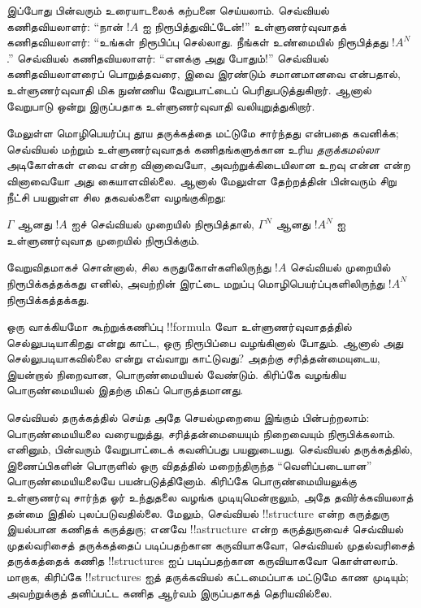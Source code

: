 \documentclass[../../../include/open-logic-section]{subfiles}
\begin{document}
இப்போது பின்வரும் உரையாடலைக் கற்பனை செய்யலாம். செவ்வியல்
கணிதவியலாளர்: ``நான் $!A$ ஐ நிரூபித்துவிட்டேன்!'' உள்ளுணர்வுவாதக்
கணிதவியலாளர்: ``உங்கள் நிரூபிப்பு செல்லாது. நீங்கள் உண்மையில்
நிரூபித்தது $!A^N$.'' செவ்வியல் கணிதவியலாளர்: ``எனக்கு அது போதும்!''
செவ்வியல் கணிதவியலாளரைப் பொறுத்தவரை, இவை இரண்டும் சமானமானவை என்பதால்,
உள்ளுணர்வுவாதி மிக நுண்ணிய வேறுபாட்டைப் பெரிதுபடுத்துகிறார். ஆனால்
வேறுபாடு ஒன்று இருப்பதாக உள்ளுணர்வுவாதி வலியுறுத்துகிறார்.

மேலுள்ள மொழிபெயர்ப்பு தூய தருக்கத்தை மட்டுமே சார்ந்தது என்பதை
கவனிக்க; செவ்வியல் மற்றும் உள்ளுணர்வுவாதக் கணிதங்களுக்கான உரிய
\emph{தருக்கமல்லா} அடிகோள்கள் எவை என்ற வினாவையோ, அவற்றுக்கிடையிலான
உறவு என்ன என்ற வினாவையோ அது கையாளவில்லை. ஆனால் மேலுள்ள தேற்றத்தின்
பின்வரும் சிறு நீட்சி பயனுள்ள சில தகவல்களை வழங்குகிறது:

\begin{thm}
$\Gamma$ ஆனது $!A$ ஐச் செவ்வியல் முறையில் நிரூபித்தால், $\Gamma^N$
ஆனது $!A^N$ ஐ உள்ளுணர்வுவாத முறையில் நிரூபிக்கும்.
\end{thm}

வேறுவிதமாகச் சொன்னால், சில கருதுகோள்களிலிருந்து $!A$ செவ்வியல்
முறையில் நிரூபிக்கத்தக்கது எனில், அவற்றின் இரட்டை மறுப்பு
மொழிபெயர்ப்புகளிலிருந்து $!A^N$ நிரூபிக்கத்தக்கது.

ஒரு வாக்கியமோ கூற்றுக்கணிப்பு !!{formula} வோ உள்ளுணர்வுவாதத்தில்
செல்லுபடியாகிறது என்று காட்ட, ஒரு நிரூபிப்பை வழங்கினால் போதும்.
ஆனால் அது செல்லுபடியாகவில்லை என்று எவ்வாறு காட்டுவது? அதற்கு
சரித்தன்மையுடைய, இயன்றால் நிறைவான, பொருண்மையியல் வேண்டும்.
கிரிப்கே வழங்கிய பொருண்மையியல் இதற்கு மிகப் பொருத்தமானது.

செவ்வியல் தருக்கத்தில் செய்த அதே செயல்முறையை இங்கும் பின்பற்றலாம்:
பொருண்மையியலை வரையறுத்து, சரித்தன்மையையும் நிறைவையும் நிரூபிக்கலாம்.
எனினும், பின்வரும் வேறுபாட்டைக் கவனிப்பது பயனுடையது. செவ்வியல்
தருக்கத்தில், இணைப்பிகளின் பொருளில் ஒரு விதத்தில் மறைந்திருந்த
``வெளிப்படையான'' பொருண்மையியலையே பயன்படுத்தினோம். கிரிப்கே
பொருண்மையியலுக்கு உள்ளுணர்வு சார்ந்த ஓர் உந்துதலை வழங்க முடியுமென்றாலும்,
அதே தவிர்க்கவியலாத் தன்மை இதில் புலப்படுவதில்லை. மேலும், செவ்வியல்
!!{structure} என்ற கருத்துரு இயல்பான கணிதக் கருத்துரு; எனவே
!!a{structure} என்ற கருத்துருவைச் செவ்வியல் முதல்வரிசைத் தருக்கத்தைப்
படிப்பதற்கான கருவியாகவோ, செவ்வியல் முதல்வரிசைத் தருக்கத்தைக் கணித
!!{structure}s ஐப் படிப்பதற்கான கருவியாகவோ கொள்ளலாம். மாறாக,
கிரிப்கே !!{structure}s ஐத் தருக்கவியல் கட்டமைப்பாக மட்டுமே காண
முடியும்; அவற்றுக்குத் தனிப்பட்ட கணித ஆர்வம் இருப்பதாகத் தெரியவில்லை.
\end{document}
